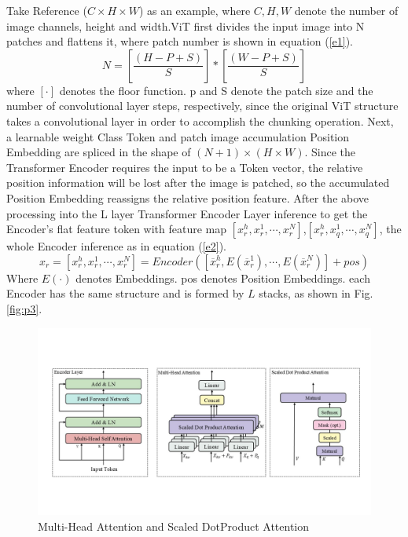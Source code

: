 \documentclass{article}
\begin{document}
Take Reference ($C\times H\times W$) as an example, where $C,H,W$ denote the number of image channels, height and width.ViT first divides the input image into N patches and flattens it, where patch number is shown in equation (\ref{e1}).
\begin{equation}\label{e1}
	N = [\frac{(H-P+S)}{S}]*[\frac{(W-P+S)}{S}]
\end{equation}
where $[\cdot]$ denotes the floor function. p and S denote the patch size and the number of convolutional layer steps, respectively, since the original ViT structure takes a convolutional layer in order to accomplish the chunking operation. Next, a learnable weight Class Token and patch image accumulation Position Embedding are spliced in the shape of $(N+1)\times(H\times W)$. Since the Transformer Encoder requires the input to be a Token vector, the relative position information will be lost after the image is patched, so the accumulated Position Embedding reassigns the relative position feature. After the above processing into the L layer Transformer Encoder Layer inference to get the Encoder's flat feature token with feature map $[x_r^h,x_r^1,\cdots,x_r^N ]$,$[x_r^h,x_q^1 ,\cdots,x_q^N]$, the whole Encoder inference as in equation (\ref{e2}).
\begin{equation}\label{e2}
	x_r=[x_r^h,x_r^1,\cdots,x_r^N ]=Encoder([\overline{x}_r^h,E(\overline{x}_r^1),\cdots,E(\overline{x}_r^N )]+pos)
\end{equation}
Where $E(\cdot)$ denotes Embeddings. pos denotes Position Embeddings. each Encoder has the same structure and is formed by $L$ stacks, as shown in Fig. \ref{fig:p3}.

\begin{figure}[htbp]
	\centering
	\includegraphics[scale=0.45]{figure/p4.jpg}
	\caption{Multi-Head Attention and Scaled DotProduct Attention}\label{fig:p4}
\end{figure}
\end{document}
